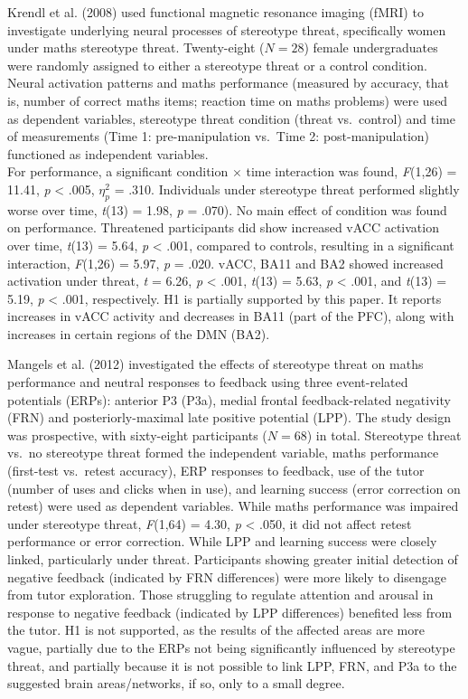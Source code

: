 \documentclass[
  stu, a4paper, 12pt,mask,floatsintext]{apa7}
\begin{document}
Krendl et al. (2008) used functional magnetic resonance imaging (fMRI) to investigate underlying neural processes of stereotype threat, specifically women under maths stereotype threat.
Twenty-eight (\(N = 28\)) female undergraduates were randomly assigned to either a stereotype threat or a control condition.
Neural activation patterns and maths performance (measured by accuracy, that is, number of correct maths items; reaction time on maths problems) were used as dependent variables, stereotype threat condition (threat vs.~control) and time of measurements (Time 1: pre-manipulation vs.~Time 2: post-manipulation) functioned as independent variables.\\
For performance, a significant condition \(\times\) time interaction was found, \emph{F}(1,26) = 11.41, \emph{p} \textless{} .005, \(\eta^{2}_{p}\) = .310.
Individuals under stereotype threat performed slightly worse over time, \emph{t}(13) = 1.98, \emph{p} = .070).
No main effect of condition was found on performance.
Threatened participants did show increased vACC activation over time, \emph{t}(13) = 5.64, \emph{p} \textless{} .001, compared to controls, resulting in a significant interaction, \emph{F}(1,26) = 5.97, \emph{p} = .020.
vACC, BA11 and BA2 showed increased activation under threat, \emph{t} = 6.26, \emph{p} \textless{} .001, \emph{t}(13) = 5.63, \emph{p} \textless{} .001, and \emph{t}(13) = 5.19, \emph{p} \textless{} .001, respectively.
H1 is partially supported by this paper. It reports increases in vACC activity and decreases in BA11 (part of the PFC), along with increases in certain regions of the DMN (BA2).

Mangels et al. (2012) investigated the effects of stereotype threat on maths performance and neutral responses to feedback using three event-related potentials (ERPs): anterior P3 (P3a), medial frontal feedback-related negativity (FRN) and posteriorly-maximal late positive potential (LPP).
The study design was prospective, with sixty-eight participants (\(N = 68\)) in total.
Stereotype threat vs.~no stereotype threat formed the independent variable, maths performance (first-test vs.~retest accuracy), ERP responses to feedback, use of the tutor (number of uses and clicks when in use), and learning success (error correction on retest) were used as dependent variables.
While maths performance was impaired under stereotype threat, \emph{F}(1,64) = 4.30, \emph{p} \textless{} .050, it did not affect retest performance or error correction.
While LPP and learning success were closely linked, particularly under threat.
Participants showing greater initial detection of negative feedback (indicated by FRN differences) were more likely to disengage from tutor exploration.
Those struggling to regulate attention and arousal in response to negative feedback (indicated by LPP differences) benefited less from the tutor.
H1 is not supported, as the results of the affected areas are more vague, partially due to the ERPs not being significantly influenced by stereotype threat, and partially because it is not possible to link LPP, FRN, and P3a to the suggested brain areas/networks, if so, only to a small degree.
\end{document}
